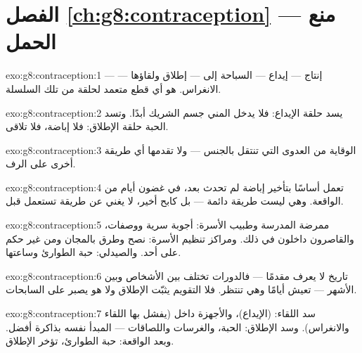 \section*{الفصل \ref{ch:g8:contraception} --- منع الحمل}

\begin{solution}{exo:g8:contraception:1}
إنتاج  --- إيداع  --- السباحة إلى 
--- إطلاق  ولقاؤها ---  --- الانغراس.  هو أي قطع متعمد لحلقة من تلك السلسلة.
\end{solution}

\begin{solution}{exo:g8:contraception:2}
يسد  حلقة الإيداع: فلا يدخل المني جسم الشريك
أبدًا. وتسد الحبة حلقة الإطلاق: فلا إباضة، فلا 
تلاقى.
\end{solution}

\begin{solution}{exo:g8:contraception:3}
الوقاية من العدوى التي تنتقل بالجنس --- ولا تقدمها أي
طريقة أخرى على الرف.
\end{solution}

\begin{solution}{exo:g8:contraception:4}
تعمل أساسًا بتأخير إباضة لم تحدث بعد، في غضون أيام من
الواقعة. وهي ليست طريقة دائمة --- بل كابح أخير، لا يغني
عن طريقة تستعمل قبل.
\end{solution}

\begin{solution}{exo:g8:contraception:5}
ممرضة المدرسة وطبيب الأسرة: أجوبة سرية ووصفات، والقاصرون
داخلون في ذلك. ومراكز تنظيم الأسرة: نصح وطرق بالمجان ومن
غير حكم على أحد. والصيدلي: حبة الطوارئ وساعتها.
\end{solution}

\begin{solution}{exo:g8:contraception:6}
تاريخ  لا يعرف مقدمًا --- فالدورات تختلف بين
الأشخاص وبين الأشهر ---  تعيش أيامًا وهي تنتظر.
فلا التقويم يثبّت الإطلاق ولا هو يصبر على السابحات.
\end{solution}

\begin{solution}{exo:g8:contraception:7}
سد اللقاء:  (الإيداع)، والأجهزة داخل  (يفشل
بها اللقاء والانغراس). وسد الإطلاق: الحبة، والغرسات
واللصاقات --- المبدأ نفسه بذاكرة أفضل. وبعد الواقعة: حبة
الطوارئ، تؤخر الإطلاق.
\end{solution}

